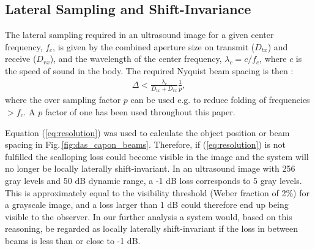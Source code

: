 \documentclass[journal]{IEEEtran}
\newcommand{\mat}[1]{\mathbf{#1}}
\renewcommand{\vec}[1]{\mathbf{#1}}
\begin{document}

\subsection{Lateral Sampling and Shift-Invariance}

The lateral sampling required in an ultrasound image for a given center frequency, $f_c$, is given by the combined aperture size on transmit ($D_{tx}$) and receive ($D_{rx}$), and the wavelength of the center frequency, $\lambda_c = c/f_c$, where $c$ is the speed of sound in the body. The required Nyquist beam spacing is then \cite{Hergum2007}:
\begin{align}
\Delta < \frac{\lambda_c}{D_{tx} + D_{rx}}\frac{1}{p}, \label{eq:resolution}
\end{align}
where the over sampling factor $p$ can be used e.g. to reduce folding of frequencies $>f_c$. A $p$ factor of one has been used throughout this paper.

Equation (\ref{eq:resolution}) was used to calculate the object position or beam spacing in Fig.\,\ref{fig:das_capon_beams}. Therefore, if (\ref{eq:resolution}) is not fulfilled the scalloping loss could become visible in the image and the system will no longer be locally laterally shift-invariant. In an ultrasound image with 256 gray levels and 50 dB dynamic range, a -1 dB loss corresponds to 5 gray levels. This is approximately equal to the visibility threshold (Weber fraction of 2\%) for a grayscale image, and a loss larger than 1 dB could therefore end up being visible to the observer. In our further analysis a system would, based on this reasoning, be regarded as locally laterally shift-invariant if the loss in between beams is less than or close to -1 dB. %
\end{document}
